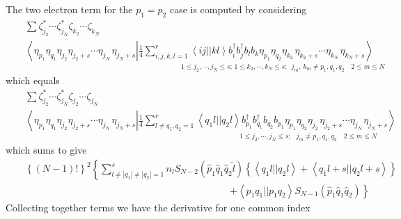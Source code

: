 The two electron term for the $p_{1}=p_{2}$ case is computed by considering 
\begin{eqnarray}
&&\sum \zeta _{j_{2}}^{\ast }\cdots \zeta _{j_{N}}^{\ast }\zeta
_{k_{2}}\cdots \zeta _{k_{N}}  \nonumber \\
&&\left\langle \eta _{p_{1}}\eta _{q_{1}}\eta _{j_{2}}\eta _{j_{2}+s}\cdots
\eta _{j_{N}\,}\eta _{j_{N}+s}\left| \frac{1}{4}\sum_{i,j,k,l=1}^{r}\left%
\langle ij||kl\right\rangle b_{i}^{\dagger }b_{j}^{\dagger }b_{l}b_{k}\eta
_{p_{1}}\eta _{q_{2}}\eta _{k_{2}\,}\eta _{k_{2}+s}\cdots \eta
_{k_{N}\,}\eta _{k_{N}+s}\right. \right\rangle  \nonumber \\
&&\qquad \qquad \qquad \qquad \qquad \qquad \qquad \qquad _{1\leq
j_{2},\cdots ,j_{N}\leq s;\,1\leq k_{2},\cdots ,k_{N}\leq
s;\,\,\,j_{m},\,k_{m}\neq p_{1},q_{1},q_{2}\quad 2\leq m\leq N}
\end{eqnarray}%
which equals 
\begin{eqnarray}
&&\sum \zeta _{j_{2}}^{\ast }\cdots \zeta _{j_{N}}^{\ast }\zeta
_{j_{2}}\cdots \zeta _{j_{N}}  \nonumber \\
&&\left\langle \eta _{p_{1}}\eta _{q_{1}}\eta _{j_{2}}\eta _{j_{2}+s}\cdots
\eta _{j_{N}\,}\eta _{j_{N}+s}\left| \frac{1}{4}\sum_{l\neq
q_{1},q_{2}=1}^{r}\left\langle q_{1}l||q_{2}l\right\rangle
b_{p_{1}}^{\dagger }b_{q_{1}}^{\dagger }b_{q_{2}}b_{p_{1}}\eta _{p_{1}}\eta
_{q_{2}}\eta _{j_{2}\,}\eta _{j_{2}+s}\cdots \eta _{j_{N}\,}\eta
_{j_{N}+s}\right. \right\rangle  \nonumber \\
&&\qquad \qquad \qquad \qquad \qquad \qquad \qquad \qquad \qquad \qquad
\qquad _{1\leq j_{2},\cdots ,j_{N}\leq s;\,\,\,\,j_{m}\neq
p_{1},q_{1},q_{2}\quad 2\leq m\leq N}
\end{eqnarray}%
which sums to give 
\begin{eqnarray}
&&\left\{ \left( N-1\right) !\right\} ^{2}\left\{ \sum_{l\neq \left|
q_{1}\right| \neq \left| q_{2}\right| =1}^{s}n_{l}S_{N-2}\left( \hat{p}_{1}%
\hat{q}_{1}\hat{q}_{2}\hat{l}\right) \left\{ \left\langle
q_{1}l||q_{2}l\right\rangle +\left\langle q_{1}l+s||q_{2}l+s\right\rangle
\right\} \right.  \nonumber \\
&&\qquad \qquad \qquad \qquad \qquad \qquad \qquad \qquad \qquad \quad
\qquad \left. +\left\langle p_{1}q_{1}||p_{1}q_{2}\right\rangle
S_{N-1}\left( \hat{p}_{1}\hat{q}_{1}\hat{q}_{2}\right) \right\}
\end{eqnarray}%
Collecting together terms we have the derivative for one common index 
